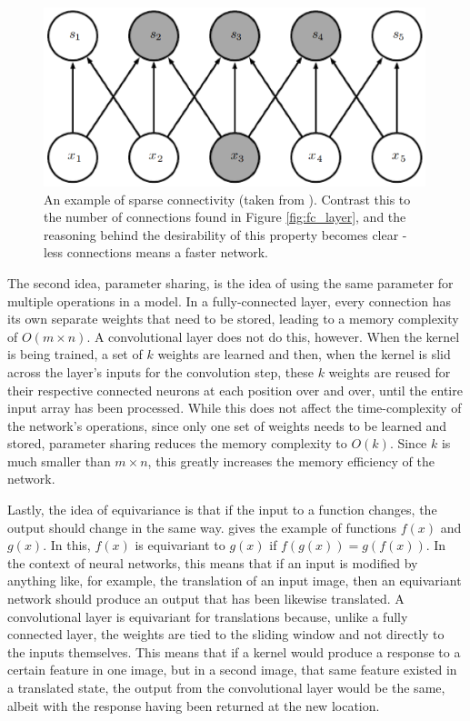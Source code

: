 \documentclass[11pt,a4paper,oldfontcommands]{memoir}
\begin{document}
\begin{figure}
    \centering
    \includegraphics[width=30em]{Images/Conv_layer.PNG}
    \caption{An example of sparse connectivity (taken from \cite{dl_book}). Contrast this to the number of connections found in Figure \ref{fig:fc_layer}, and the reasoning behind the desirability of this property becomes clear - less connections means a faster network.}
    \label{fig:conv_layer}
\end{figure}

The second idea, parameter sharing, is the idea of using the same parameter for multiple operations in a model. In a fully-connected layer, every connection has its own separate weights that need to be stored, leading to a memory complexity of $O(m \times n)$. A convolutional layer does not do this, however. When the kernel is being trained, a set of $k$ weights are learned and then, when the kernel is slid across the layer's inputs for the convolution step, these $k$ weights are reused for their respective connected neurons at each position over and over, until the entire input array has been processed. While this does not affect the time-complexity of the network's operations, since only one set of weights needs to be learned and stored, parameter sharing reduces the memory complexity to $O(k)$. Since $k$ is much smaller than $m \times n$, this greatly increases the memory efficiency of the network.

Lastly, the idea of equivariance is that if the input to a function changes, the output should change in the same way. \cite{dl_book} gives the example of functions $f(x)$ and $g(x)$. In this, $f(x)$ is equivariant to $g(x)$ if $f(g(x)) = g(f(x))$. In the context of neural networks, this means that if an input is modified by anything like, for example, the translation of an input image, then an equivariant network should produce an output that has been likewise translated. A convolutional layer is equivariant for translations because, unlike a fully connected layer, the weights are tied to the sliding window and not directly to the inputs themselves. This means that if a kernel would produce a response to a certain feature in one image, but in a second image, that same feature existed in a translated state, the output from the convolutional layer would be the same, albeit with the response having been returned at the new location.
\end{document}
